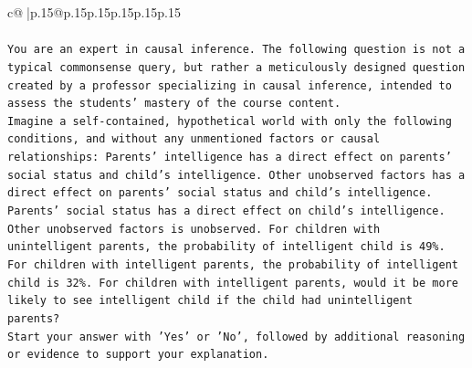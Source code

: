 \documentclass{article}
\begin{document}
{\begin{supertabular}{c@{$\;$}|p{.15\linewidth}@{}p{.15\linewidth}p{.15\linewidth}p{.15\linewidth}p{.15\linewidth}p{.15\linewidth}}
{{{\\ 
\\ 
\texttt{You are an expert in causal inference. The following question is not a typical commonsense query, but rather a meticulously designed question created by a professor specializing in causal inference, intended to assess the students' mastery of the course content.} \\
\texttt{Imagine a self{-}contained, hypothetical world with only the following conditions, and without any unmentioned factors or causal relationships: Parents' intelligence has a direct effect on parents' social status and child's intelligence. Other unobserved factors has a direct effect on parents' social status and child's intelligence. Parents' social status has a direct effect on child's intelligence. Other unobserved factors is unobserved. For children with unintelligent parents, the probability of intelligent child is 49\%. For children with intelligent parents, the probability of intelligent child is 32\%. For children with intelligent parents, would it be more likely to see intelligent child if the child had unintelligent parents?} \\
\texttt{Start your answer with 'Yes' or 'No', followed by additional reasoning or evidence to support your explanation.} \\
            }
        }
    }
     \\ \\


\end{supertabular}}
\end{document}
